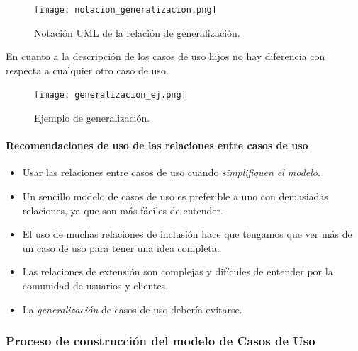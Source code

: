 \documentclass[12pt,spanish]{article}
\begin{document}
\begin{figure}[H]
\centering
\texttt{[image: notacion\_generalizacion.png]}
\caption{Notación UML de la relación de generalización.}
\end{figure}

En cuanto a la descripción de los casos de uso hijos no hay diferencia con respecta a cualquier otro caso de uso.

\begin{figure}[H]
\centering
\texttt{[image: generalizacion\_ej.png]}
\caption{Ejemplo de generalización.}
\end{figure}

\paragraph{Recomendaciones de uso de las relaciones entre casos de uso}

\begin{itemize}
	\item Usar las relaciones entre casos de uso cuando \emph{simplifiquen el modelo}.
	\item Un sencillo modelo de casos de uso es preferible a uno con demasiadas relaciones, ya que son más fáciles de entender.
	\item El uso de muchas relaciones de inclusión hace que tengamos que ver más de un caso de uso para tener una idea completa.
	\item Las relaciones de extensión son complejas y difícules de entender por la comunidad de usuarios y clientes.
	\item La \emph{generalización} de casos de uso debería evitarse.
\end{itemize}
\subsubsection{Proceso de construcción del modelo de Casos de Uso}
\end{document}
